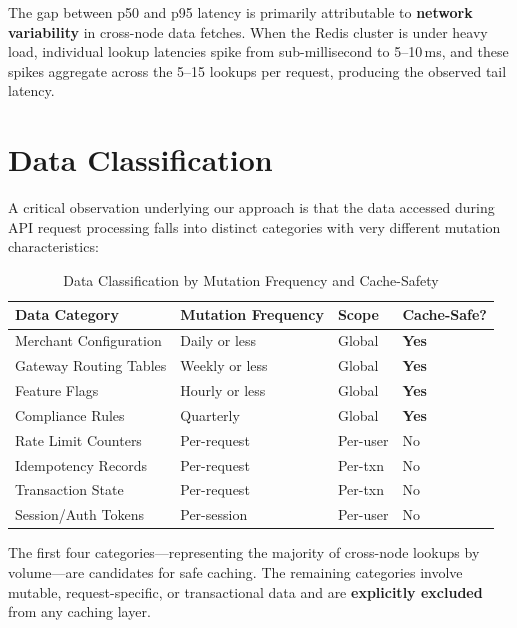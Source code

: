 \documentclass[12pt,a4paper]{report}
\begin{document}
The gap between p50 and p95 latency is primarily attributable to \textbf{network variability} in cross-node data fetches. When the Redis cluster is under heavy load, individual lookup latencies spike from sub-millisecond to 5–10\,ms, and these spikes aggregate across the 5–15 lookups per request, producing the observed tail latency.

\section{Data Classification}

A critical observation underlying our approach is that the data accessed during API request processing falls into distinct categories with very different mutation characteristics:

\begin{table}[h]
\centering
\begin{tabular}{@{} l l l l @{}}
\toprule
\textbf{Data Category} & \textbf{Mutation Frequency} & \textbf{Scope} & \textbf{Cache-Safe?} \\
\midrule
Merchant Configuration & Daily or less & Global & \textbf{Yes} \\
Gateway Routing Tables & Weekly or less & Global & \textbf{Yes} \\
Feature Flags & Hourly or less & Global & \textbf{Yes} \\
Compliance Rules & Quarterly & Global & \textbf{Yes} \\
Rate Limit Counters & Per-request & Per-user & No \\
Idempotency Records & Per-request & Per-txn & No \\
Transaction State & Per-request & Per-txn & No \\
Session/Auth Tokens & Per-session & Per-user & No \\
\bottomrule
\end{tabular}
\caption{Data Classification by Mutation Frequency and Cache-Safety}
\label{tab:data-classification}
\end{table}

The first four categories—representing the majority of cross-node lookups by volume—are candidates for safe caching. The remaining categories involve mutable, request-specific, or transactional data and are \textbf{explicitly excluded} from any caching layer.


\end{document}
